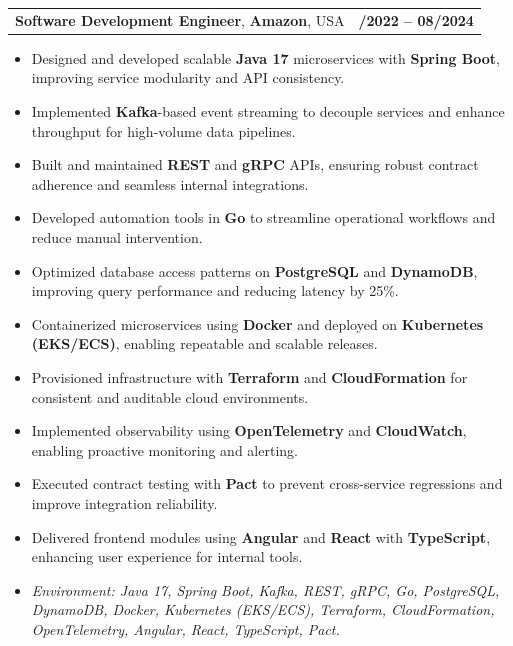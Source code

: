 \documentclass[letterpaper,11pt]{article}
\makeatletter
\newcommand{\resumeItem}[1]{
  \item\footnotesize{
    {#1 \vspace{-2pt}}
  }
}
\newcommand{\resumeSubheading}[4]{
  \vspace{-2pt}\item
    \begin{tabular*}{1.0\textwidth}[t]{l@{\extracolsep{\fill}}r}
      \textbf{\fontsize{10pt}{14pt}\selectfont #3}, \textbf{\fontsize{10pt}{14pt}\selectfont #1}, \fontsize{10pt}{14pt}\selectfont #4 & \textbf{\fontsize{10pt}{14pt}\selectfont #2} \\
    \end{tabular*}\vspace{-7pt}
}
\newcommand{\resumeItemListStart}{\begin{itemize}[leftmargin=*]}
\newcommand{\resumeItemListEnd}{\end{itemize}\vspace{-5pt}}
\makeatother
\begin{document}
\resumeSubheading
{Amazon}{10/2022 -- 08/2024}
{Software Development Engineer}{USA}
\resumeItemListStart
  \resumeItem{Designed and developed scalable \textbf{Java 17} microservices with \textbf{Spring Boot}, improving service modularity and API consistency.}
  \resumeItem{Implemented \textbf{Kafka}-based event streaming to decouple services and enhance throughput for high-volume data pipelines.}
  \resumeItem{Built and maintained \textbf{REST} and \textbf{gRPC} APIs, ensuring robust contract adherence and seamless internal integrations.}
  \resumeItem{Developed automation tools in \textbf{Go} to streamline operational workflows and reduce manual intervention.}
  \resumeItem{Optimized database access patterns on \textbf{PostgreSQL} and \textbf{DynamoDB}, improving query performance and reducing latency by 25\%.}
  \resumeItem{Containerized microservices using \textbf{Docker} and deployed on \textbf{Kubernetes (EKS/ECS)}, enabling repeatable and scalable releases.}
  \resumeItem{Provisioned infrastructure with \textbf{Terraform} and \textbf{CloudFormation} for consistent and auditable cloud environments.}
  \resumeItem{Implemented observability using \textbf{OpenTelemetry} and \textbf{CloudWatch}, enabling proactive monitoring and alerting.}
  \resumeItem{Executed contract testing with \textbf{Pact} to prevent cross-service regressions and improve integration reliability.}
  \resumeItem{Delivered frontend modules using \textbf{Angular} and \textbf{React} with \textbf{TypeScript}, enhancing user experience for internal tools.}
  \resumeItem{\textit{Environment: Java 17, Spring Boot, Kafka, REST, gRPC, Go, PostgreSQL, DynamoDB, Docker, Kubernetes (EKS/ECS), Terraform, CloudFormation, OpenTelemetry, Angular, React, TypeScript, Pact.}}
\resumeItemListEnd
\end{document}
